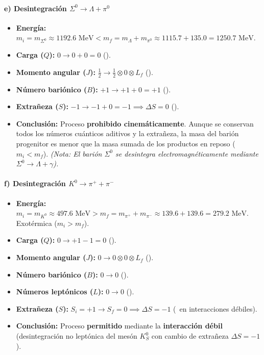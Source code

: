 \begin{problema}
\paragraph{e) Desintegración $\Sigma^0 \to \Lambda + \pi^0$}
\begin{itemize}
    \item \textbf{Energía:} $m_i = m_{\Sigma^0} \approx 1192.6\text{ MeV} < m_f = m_\Lambda + m_{\pi^0} \approx 1115.7 + 135.0 = 1250.7\text{ MeV}$.
    \item \textbf{Carga ($Q$):} $0 \to 0 + 0 = 0$ (\checkmark).
    \item \textbf{Momento angular ($J$):} $\frac{1}{2} \to \frac{1}{2} \otimes 0 \otimes L_f$ (\checkmark).
    \item \textbf{Número bariónico ($B$):} $+1 \to +1 + 0 = +1$ (\checkmark).
    \item \textbf{Extrañeza ($S$):} $-1 \to -1 + 0 = -1 \implies \Delta S = 0$ (\checkmark).
    \item \textbf{Conclusión:} Proceso \textbf{prohibido cinemáticamente}. Aunque se conservan todos los números cuánticos aditivos y la extrañeza, la masa del barión progenitor es menor que la masa sumada de los productos en reposo ($m_i < m_f$). \textit{(Nota: El barión $\Sigma^0$ se desintegra electromagnéticamente mediante $\Sigma^0 \to \Lambda + \gamma$).}
\end{itemize}

\paragraph{f) Desintegración $K^0 \to \pi^+ + \pi^-$}
\begin{itemize}
    \item \textbf{Energía:} $m_i = m_{K^0} \approx 497.6\text{ MeV} > m_f = m_{\pi^+} + m_{\pi^-} \approx 139.6 + 139.6 = 279.2\text{ MeV}$. Exotérmica ($m_i > m_f$).
    \item \textbf{Carga ($Q$):} $0 \to +1 - 1 = 0$ (\checkmark).
    \item \textbf{Momento angular ($J$):} $0 \to 0 \otimes 0 \otimes L_f$ (\checkmark).
    \item \textbf{Número bariónico ($B$):} $0 \to 0$ (\checkmark).
    \item \textbf{Números leptónicos ($L$):} $0 \to 0$ (\checkmark).
    \item \textbf{Extrañeza ($S$):} $S_i = +1 \to S_f = 0 \implies \Delta S = -1$ (\checkmark\, en interacciones débiles).
    \item \textbf{Conclusión:} Proceso \textbf{permitido} mediante la \textbf{interacción débil} (desintegración no leptónica del mesón $K_S^0$ con cambio de extrañeza $\Delta S = -1$).
\end{itemize}


\end{problema}
